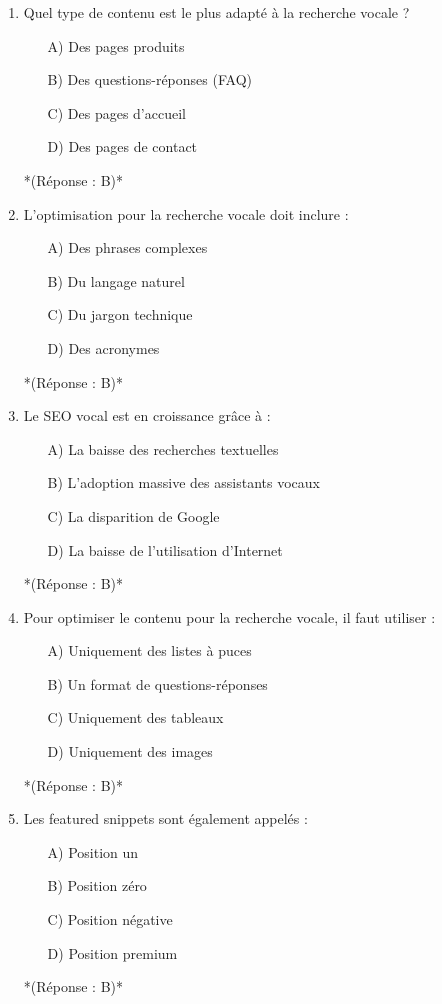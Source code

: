\documentclass[12pt,a4paper,twoside]{report}
\begin{document}
\begin{enumerate}
    \item Quel type de contenu est le plus adapté à la recherche vocale ?
    \begin{itemize}
        \item[A)] Des pages produits
        \item[B)] Des questions-réponses (FAQ)
        \item[C)] Des pages d'accueil
        \item[D)] Des pages de contact
    \end{itemize}
    *(Réponse : B)*

    \item L'optimisation pour la recherche vocale doit inclure :
    \begin{itemize}
        \item[A)] Des phrases complexes
        \item[B)] Du langage naturel
        \item[C)] Du jargon technique
        \item[D)] Des acronymes
    \end{itemize}
    *(Réponse : B)*

    \item Le SEO vocal est en croissance grâce à :
    \begin{itemize}
        \item[A)] La baisse des recherches textuelles
        \item[B)] L'adoption massive des assistants vocaux
        \item[C)] La disparition de Google
        \item[D)] La baisse de l'utilisation d'Internet
    \end{itemize}
    *(Réponse : B)*

    \item Pour optimiser le contenu pour la recherche vocale, il faut utiliser :
    \begin{itemize}
        \item[A)] Uniquement des listes à puces
        \item[B)] Un format de questions-réponses
        \item[C)] Uniquement des tableaux
        \item[D)] Uniquement des images
    \end{itemize}
    *(Réponse : B)*

    \item Les featured snippets sont également appelés :
    \begin{itemize}
        \item[A)] Position un
        \item[B)] Position zéro
        \item[C)] Position négative
        \item[D)] Position premium
    \end{itemize}
    *(Réponse : B)*


\end{enumerate}
\end{document}
